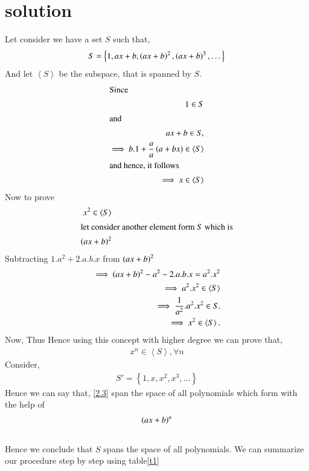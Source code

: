\documentclass[journal,12pt,twocolumn]{IEEEtran}
\begin{document}
\section{solution}
 Let consider we have a set $S$ such that,
 \begin{align}
 S = \left \{    1, ax+b, \left(ax+b\right)^2, \left(ax+b\right)^3,  \dots  \right \}
 \end{align}
 And let $\left \langle S \right \rangle$ be the subspace, that is spanned by $S$.
 \begin{align}
 \intertext{Since}
  1 \in S\\
 \intertext{and}
  ax+b \in S,\\
  \implies  b.1 + \frac{a}{a}\left(a +bx\right) \in \left \langle S \right \rangle \\
  \intertext{and hence, it follows}
   \implies x \in \left \langle S \right \rangle 
 \end{align}
 Now to prove
 \begin{align}
  x^2 \in \left \langle S \right \rangle \\
 \intertext{let consider another element form $S$ which is}
    \left(ax+b\right)^2
\end{align}
Subtracting $1.a^2 +2.a.b.x$ from $\left(ax+b\right)^2$
 \begin{align}
 \implies \left(ax+b\right)^2 - a^2 - 2.a.b.x = a^2.x^2 \label{2.2}\\
 \implies a^2.x^2 \in \left \langle S \right \rangle\\
 \implies   \frac{1}{a^2} . a^2. x^2 \in S.\\
 \implies x^2 \in  \left \langle S \right \rangle .
 \end{align}
 Now, Thus  Hence using this concept with higher degree we can prove that,
 \begin{align}
   x^n \in  \left \langle S \right \rangle, \forall  n
  \end{align}
Consider,
 \begin{align}
 S' =   \left \{    1, x, x^2, x^3,  \dots  \right \} \label{2.3}
   \end{align}
 Hence we can say that, \eqref{2.3} span the space of all polynomials which form with the help of
 \begin{align} 
  \left(ax + b\right)^n
  \end{align}
 \\  Hence we conclude   that $S$ spans the space of all polynomials.
We can summarize our procedure step by step using table\ref{t1}
\end{document}
